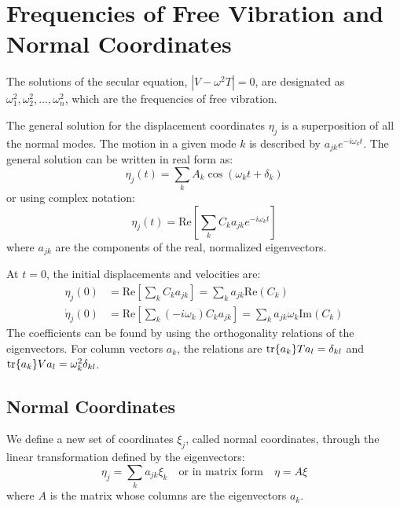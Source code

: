 \documentclass[12pt]{article}
\begin{document}
	\section{Frequencies of Free Vibration and Normal Coordinates}
	
	The solutions of the secular equation, $|V - \omega^2 T| = 0$, are designated as $\omega_1^2, \omega_2^2, \dots, \omega_n^2$, which are the frequencies of free vibration.
	
	The general solution for the displacement coordinates $\eta_j$ is a superposition of all the normal modes. The motion in a given mode $k$ is described by $a_{jk} e^{-i\omega_k t}$. The general solution can be written in real form as:
	\[
	\eta_j(t) = \sum_k A_k \cos(\omega_k t + \delta_k)
	\]
	or using complex notation:
	\[
	\eta_j(t) = \text{Re} \left[ \sum_k C_k a_{jk} e^{-i\omega_k t} \right]
	\]
	where $a_{jk}$ are the components of the real, normalized eigenvectors.
	
	At $t=0$, the initial displacements and velocities are:
	\begin{align*}
		\eta_j(0) &= \text{Re} \left[ \sum_k C_k a_{jk} \right] = \sum_k a_{jk} \text{Re}(C_k) \\
		\dot{\eta}_j(0) &= \text{Re} \left[ \sum_k (-i\omega_k) C_k a_{jk} \right] = \sum_k a_{jk} \omega_k \text{Im}(C_k)
	\end{align*}
	The coefficients can be found by using the orthogonality relations of the eigenvectors. For column vectors $a_k$, the relations are $\tr{a_k} T a_l = \delta_{kl}$ and $\tr{a_k} V a_l = \omega_k^2 \delta_{kl}$.
	
	\subsection*{Normal Coordinates}
	We define a new set of coordinates $\xi_j$, called normal coordinates, through the linear transformation defined by the eigenvectors:
	\[
	\eta_j = \sum_k a_{jk} \xi_k \quad \text{or in matrix form} \quad \eta = A \xi
	\]
	where $A$ is the matrix whose columns are the eigenvectors $a_k$.
	
\end{document}
